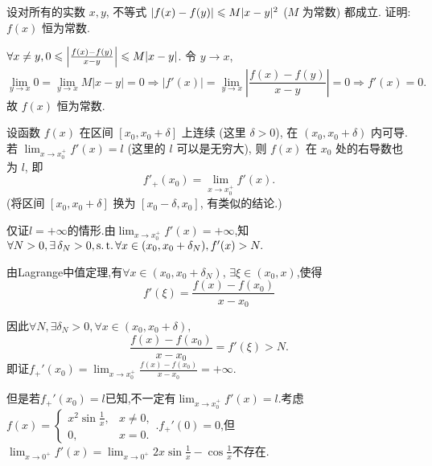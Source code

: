 \begin{exercise}[3.3.12]
    设对所有的实数 $x,y$, 不等式 $|f(x)-f(y)| \leqslant M|x-y|^2$ ($M$ 为常数) 都成立. 证明: $f(x)$ 恒为常数.
\end{exercise}

\begin{solution}
    $\forall x \ne y, 0 \leqslant \left|\frac{f(x)-f(y)}{x-y}\right| \leqslant M|x-y|$. 令 $y \to x$,
    $$ \lim_{y\to x} 0 = \lim_{y\to x} M|x-y| = 0 \Rightarrow |f'(x)| = \lim_{y\to x} \left|\frac{f(x) - f(y)}{x-y}\right| = 0 \Rightarrow f'(x) = 0. $$
    故 $f(x)$ 恒为常数.
\end{solution}

\begin{exercise}[3.3.13]
    设函数 $f(x)$ 在区间 $[x_0, x_0+\delta]$ 上连续 (这里 $\delta>0$), 在 $(x_0, x_0+\delta)$ 内可导. 若 $\lim_{x \to x_0^+} f'(x) = l$ (这里的 $l$ 可以是无穷大), 则 $f(x)$ 在 $x_0$ 处的右导数也为 $l$, 即
    $$ f'_+(x_0) = \lim_{x \to x_0^+} f'(x). $$
    (将区间 $[x_0, x_0+\delta]$ 换为 $[x_0-\delta, x_0]$, 有类似的结论.)
\end{exercise}


\begin{solution}
    仅证$l=+\infty$的情形.由$\lim_{x \to x_0^+} f'(x) = +\infty$,知$\forall N > 0, \exists \delta_N > 0, \st \forall x \in (x_0, x_0 + \delta_N), f'(x) > N.$

    由Lagrange中值定理,有$\forall x \in (x_0,x_0 + \delta_N)$, $\exists \xi \in (x_0,x)$,使得$$f'(\xi) = \frac{f(x)-f(x_0)}{x-x_0}$$

    因此$\forall N, \exists \delta_N > 0 , \forall x \in (x_0,x_0+\delta),$
    $$\frac{f(x)-f(x_0)}{x-x_0} = f'(\xi) > N.$$
    即证$f_+'(x_0) = \lim_{x \to x_0^+} \frac{f(x)-f(x_0)}{x-x_0} = + \infty.$
\end{solution}

但是若$f_+'(x_0)=l$已知,不一定有$\lim_{x \to x_0^+} f'(x) = l$.考虑$f(x) = \begin{cases} x^2\sin\frac{1}{x}, & x \ne 0, \\ 0, & x = 0. \end{cases}$.$f_+'(0) = 0$,但$\lim_{x \to 0^+} f'(x) = \lim_{x \to 0^+} 2x\sin\frac{1}{x} - \cos\frac{1}{x}$不存在.

